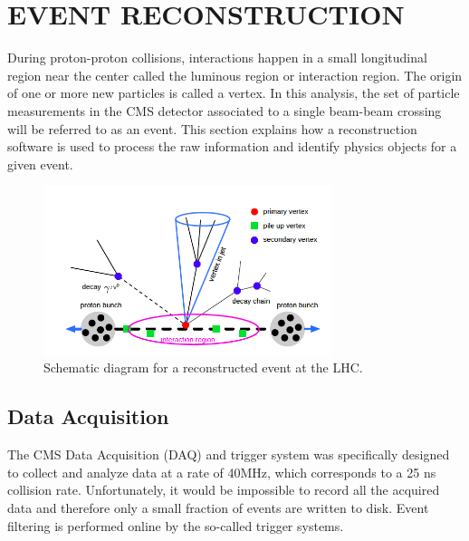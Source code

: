 %
%
%
%



\chapter{EVENT RECONSTRUCTION \label{cha:eventreco}}
During proton-proton collisions, interactions happen in a small longitudinal region near the center called the luminous region or interaction region. The origin of one or more new particles is called a vertex. In this analysis, the set of particle measurements in the CMS detector associated to a single beam-beam crossing will be referred to as an event. This section explains how a reconstruction software is used to process the raw information and identify physics objects for a given event. 

 \begin{figure}[H]
 	\centering
 	\includegraphics[width=0.75\textwidth]{figures/eventvertex.png}
 	\singlespace
 	\caption{Schematic diagram for a reconstructed event at the LHC.}
 	\label{fig:vertex}
 \end{figure}


\section{Data Acquisition}
The CMS Data Acquisition (DAQ) and trigger system was specifically designed to collect and analyze data at a rate of 40MHz, which corresponds to a 25 ns collision rate. Unfortunately, it would be impossible to record all the acquired data and therefore only a small fraction of events are written to disk. Event filtering is performed online by the so-called trigger systems.

